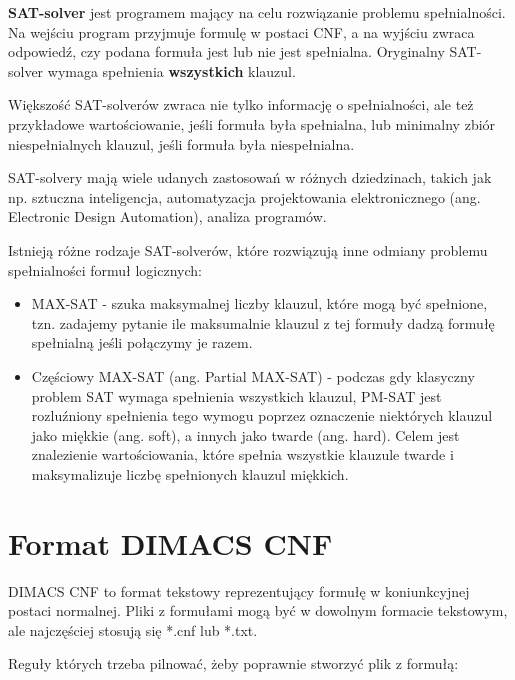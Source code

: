 \documentclass[a4paper,12pt,oneside]{book}
\theoremstyle{definition}
\begin{document}
\textbf{SAT-solver} jest programem mający na celu rozwiązanie problemu spełnialności. Na wejściu program przyjmuje formulę w postaci CNF, a na wyjściu zwraca odpowiedź, czy podana formuła jest lub nie jest spełnialna. Oryginalny SAT-solver wymaga spełnienia \textbf{wszystkich} klauzul.

Większość SAT-solverów zwraca nie tylko informację o spełnialności, ale też przykładowe wartościowanie, jeśli formuła była spełnialna, lub minimalny zbiór niespełnialnych klauzul, jeśli formuła była niespełnialna.

SAT-solvery mają wiele udanych zastosowań w różnych dziedzinach, takich jak np. sztuczna inteligencja, automatyzacja projektowania elektronicznego (ang. Electronic Design Automation), analiza programów.

Istnieją różne rodzaje SAT-solverów, które rozwiązują inne odmiany problemu spełnialności formuł logicznych: 

\begin{itemize}
    \item MAX-SAT - szuka maksymalnej liczby klauzul, które mogą być spełnione, tzn. zadajemy pytanie ile maksumalnie klauzul z tej formuły dadzą formułę spełnialną jeśli połączymy je razem.
    \item Częściowy MAX-SAT (ang. Partial MAX-SAT) - podczas gdy klasyczny problem SAT wymaga spełnienia wszystkich klauzul, PM-SAT jest rozluźniony spełnienia tego wymogu poprzez oznaczenie niektórych klauzul jako miękkie (ang. soft), a innych jako twarde (ang. hard). Celem jest znalezienie wartościowania, które spełnia wszystkie klauzule twarde i maksymalizuje liczbę spełnionych klauzul miękkich.

\end{itemize}

\section{Format DIMACS CNF}

DIMACS CNF to format tekstowy reprezentujący formułę w koniunkcyjnej postaci normalnej. Pliki z formułami mogą być w dowolnym formacie tekstowym, ale najczęściej stosują się *.cnf lub *.txt. 

Reguły których trzeba pilnować, żeby poprawnie stworzyć plik z formułą: 
\end{document}
